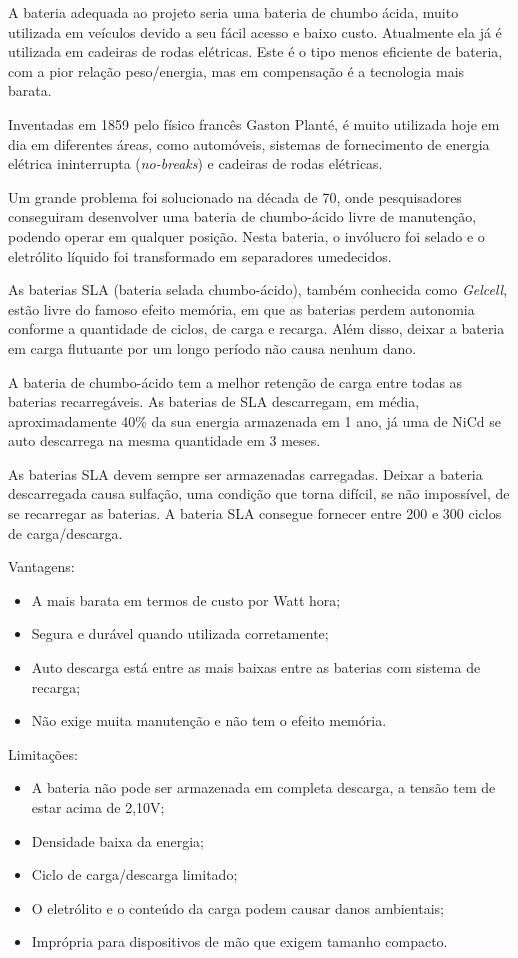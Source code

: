 A bateria adequada ao projeto seria uma bateria de chumbo ácida, muito utilizada em veículos devido a seu fácil acesso e baixo custo. Atualmente ela já é utilizada em cadeiras de rodas elétricas. Este é o tipo menos eficiente de bateria, com a pior relação peso/energia, mas em compensação é a tecnologia mais barata.

Inventadas em 1859 pelo físico francês Gaston Planté, é muito utilizada hoje em dia em diferentes áreas, como automóveis, sistemas de fornecimento de energia elétrica ininterrupta (\textit{no-breaks}) e cadeiras de rodas elétricas.

Um grande problema foi solucionado na década de 70, onde pesquisadores conseguiram desenvolver uma bateria de chumbo-ácido livre de manutenção, podendo operar em qualquer posição. Nesta bateria, o invólucro foi selado e o eletrólito líquido foi transformado em separadores umedecidos.

As baterias SLA (bateria selada chumbo-ácido), também conhecida como \textit{Gelcell}, estão livre do famoso efeito memória, em que as baterias perdem autonomia conforme a quantidade de ciclos, de carga e recarga. Além disso, deixar a bateria em carga flutuante por um longo período não causa nenhum dano.

A bateria de chumbo-ácido tem a melhor retenção de carga entre todas as baterias recarregáveis. As baterias de SLA descarregam, em média, aproximadamente 40\% da sua energia armazenada em 1 ano, já uma de NiCd se auto descarrega na mesma quantidade em 3 meses.

As baterias SLA devem sempre ser armazenadas carregadas. Deixar a bateria descarregada causa sulfação, uma condição que torna difícil, se não impossível, de se recarregar as baterias. A bateria SLA consegue fornecer entre 200 e 300 ciclos de carga/descarga.

Vantagens:

\begin{itemize}
	\item A mais barata em termos de custo por Watt hora;
	\item Segura e durável quando utilizada corretamente;
	\item Auto descarga está entre as mais baixas entre as baterias com sistema de recarga;
	\item Não exige muita manutenção e não tem o efeito memória.
\end{itemize}

Limitações:

\begin{itemize}
	\item A bateria não pode ser armazenada em completa descarga, a tensão tem de estar acima de 2,10V;
	\item Densidade baixa da energia;
	\item Ciclo de carga/descarga limitado;
	\item O eletrólito e o conteúdo da carga podem causar danos ambientais;
	\item Imprópria para dispositivos de mão que exigem tamanho compacto.
\end{itemize}

